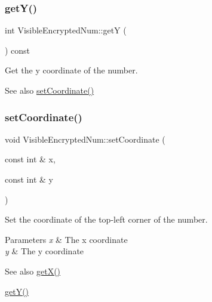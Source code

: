 \subsubsection{\texorpdfstring{get\+Y()}{getY()}}
{\footnotesize\ttfamily int Visible\+Encrypted\+Num\+::getY (\begin{DoxyParamCaption}{ }\end{DoxyParamCaption}) const\hspace{0.3cm}{\ttfamily [virtual]}}



Get the y coordinate of the number. 

\begin{DoxySeeAlso}{See also}
\mbox{\hyperlink{class_visible_encrypted_num_a79b010bfd2b90f1c0398a4ccfed80912}{set\+Coordinate()}} 
\end{DoxySeeAlso}
\mbox{\label{class_visible_encrypted_num_a79b010bfd2b90f1c0398a4ccfed80912}} 
\subsubsection{\texorpdfstring{set\+Coordinate()}{setCoordinate()}}
{\footnotesize\ttfamily void Visible\+Encrypted\+Num\+::set\+Coordinate (\begin{DoxyParamCaption}\item[{const int \&}]{x,  }\item[{const int \&}]{y }\end{DoxyParamCaption})\hspace{0.3cm}{\ttfamily [virtual]}}



Set the coordinate of the top-\/left corner of the number. 


\begin{DoxyParams}{Parameters}
{\em x} & The x coordinate \\
\hline
{\em y} & The y coordinate \\
\hline
\end{DoxyParams}
\begin{DoxySeeAlso}{See also}
\mbox{\hyperlink{class_visible_encrypted_num_a86bf5a8a6fe1532c3575c4cc7f1e20a0}{get\+X()}} 

\mbox{\hyperlink{class_visible_encrypted_num_a9ee9f0f402141ca4d4692b8470a76ba0}{get\+Y()}} 
\end{DoxySeeAlso}
\mbox{\label{class_visible_encrypted_num_a98161acb7fdfd6455286613a6d41cb4c}} 
